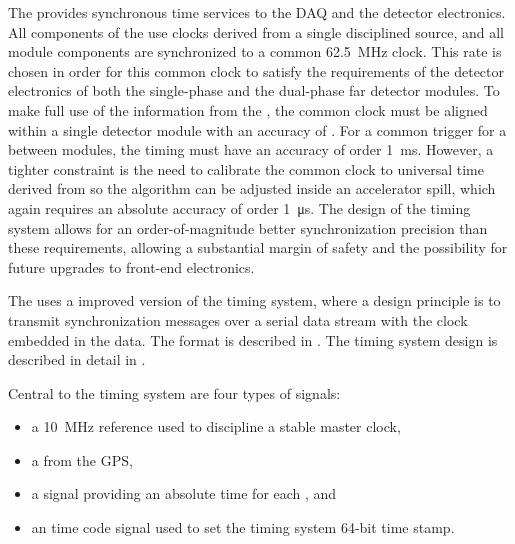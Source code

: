 The  provides synchronous time services to the DAQ and the detector electronics.
All components of the  use clocks derived from a single
 disciplined source, and all module components are
synchronized to a common \SI{62.5}{MHz} clock.
%
This rate is chosen in order for this common clock to satisfy the requirements of the detector electronics of both the single-phase and the dual-phase far detector modules.
%
To make full use of the information from the , the common clock must be aligned within a single detector %
module with an accuracy of . 
For a common trigger for a  between modules, the timing must have an accuracy of order \SI{1}{\milli\second}.
However, a tighter constraint is the need to calibrate the common clock to universal time derived from  so the  algorithm can be adjusted inside an accelerator spill, which again requires an absolute accuracy of order \SI{1}{\micro\second}. The design of the timing system allows for an order-of-magnitude better synchronization precision than these requirements, allowing a substantial margin of safety and the possibility for future upgrades to front-end electronics.


The   uses a improved version of the  timing
system, where a design principle is to transmit synchronization messages over
a serial data stream with the clock embedded in the data. The format
is described in . The timing system design is
described in detail in .

Central to the timing system are four types of signals:
\begin{itemize}
\item a \SI{10}{\mega\hertz} reference used to discipline a stable master clock,
\item a  from the GPS,
\item a  signal providing an absolute time for each , and
\item an  time code signal
  used to set the timing system 64-bit time stamp.
\end{itemize}


